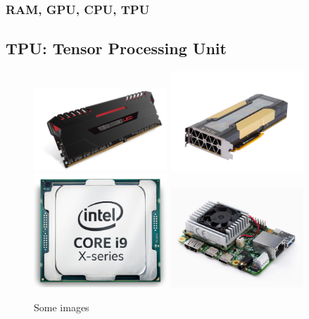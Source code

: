 \documentclass[11pt]{beamer}
\begin{document}
\begin{frame}
	\frametitle{RAM, GPU, CPU, TPU}
	\subsection{TPU: Tensor Processing Unit}
\begin{figure}
	\includegraphics[width=50mm,scale=0.5]{ram5}\hspace{2mm}
	\includegraphics[width=50mm,scale=0.5]{v100}
	\\[\smallskipamount]
	\includegraphics[width=50mm,scale=0.5]{cpu2}\hspace{2mm}
	\includegraphics[width=50mm,scale=0.5]{tpu}
	\caption{Some images}\label{fig:foobar}
\end{figure}
\end{frame}
\end{document}
